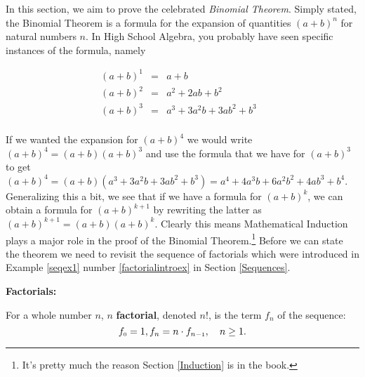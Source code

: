 \documentclass{ximera}
\begin{document}
	\author{Stitz-Zeager}




\setcounter{footnote}{0}

\label{Binomial}

In this section, we aim to prove the celebrated \textit{Binomial Theorem}.  Simply stated, the Binomial Theorem is a formula for the expansion of quantities $(a+b)^n$ for natural numbers $n$.  In High School Algebra, you probably have seen specific instances of the formula, namely

\[ \begin{array}{rclr}

(a+b)^1 & = & a + b & \\
(a+b)^2 & = & a^2 + 2ab + b^2 & \\
(a+b)^3 & = & a^3 + 3a^2 b + 3ab^2 + b^3 & \\
\end{array}\]

If we wanted the expansion for $(a+b)^4$ we would write $(a+b)^4 = (a+b)(a+b)^3$ and use the formula that we have for $(a+b)^3$ to get $(a+b)^4 = (a+b) \left( a^3 + 3a^2 b + 3ab^2 + b^3 \right) = a^4 + 4a^3b + 6a^2b^2 + 4ab^3 + b^4$.  Generalizing this a bit, we see that if we have a formula for $(a+b)^{k}$, we can obtain a formula for $(a+b)^{k+1}$ by rewriting the latter as $(a+b)^{k+1} = (a+b)(a+b)^{k}$.  Clearly this means Mathematical Induction plays a major role in the proof of the Binomial Theorem.\footnote{It's pretty much the reason Section \ref{Induction} is in the book.}  Before we can state the theorem we need to revisit the sequence of factorials which were introduced in Example \ref{seqex1} number \ref{factorialintroex} in Section \ref{Sequences}.

\medskip

\colorbox{ResultColor}{\bbm 

\begin{definition}  \label{factorialdefn}  \textbf{Factorials:}  

For a whole number $n$,  {\boldmath $n$} \textbf{factorial}, denoted $n!$,  is the term $f_{n}$ of the sequence: \[ f_{\mbox{\tiny$0$}} = 1, f_{n} =n \cdot f_{n-\mbox{\tiny$1$}}, \quad n \geq 1.\]


\end{definition}

\ebm}


\medskip
\end{document}
